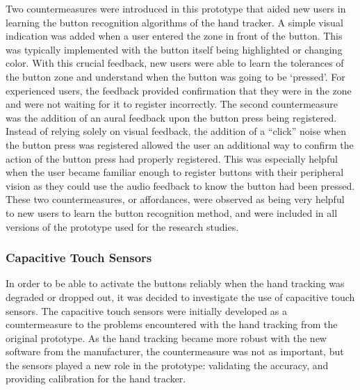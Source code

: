 Two countermeasures were introduced in this prototype that aided new users in learning the button recognition algorithms of the hand tracker.
A simple visual indication was added when a user entered the zone in front of the button.
This was typically implemented with the button itself being highlighted or changing color.
With this crucial feedback, new users were able to learn the tolerances of the button zone and understand when the button was going to be `pressed'.
For experienced users, the feedback provided confirmation that they were in the zone and were not waiting for it to register incorrectly.
The second countermeasure was the addition of an aural feedback upon the button press being registered.
Instead of relying solely on visual feedback, the addition of a ``click'' noise when the button press was registered allowed the user an additional way to confirm the action of the button press had properly registered.
This was especially helpful when the user became familiar enough to register buttons with their peripheral vision as they could use the audio feedback to know the button had been pressed.
These two countermeasures, or affordances, were observed as being very helpful to new users to learn the button recognition method, and were included in all versions of the prototype used for the research studies.

\subsubsection{Capacitive Touch Sensors}
\label{sec:proto_cap_touch}

In order to be able to activate the buttons reliably when the hand tracking was degraded or dropped out, it was decided to investigate the use of capacitive touch sensors.
The capacitive touch sensors were initially developed as a countermeasure to the problems encountered with the hand tracking from the original prototype.
As the hand tracking became more robust with the new software from the manufacturer, the countermeasure was not as important, but the sensors played a new role in the prototype: validating the accuracy, and providing calibration for the hand tracker.

